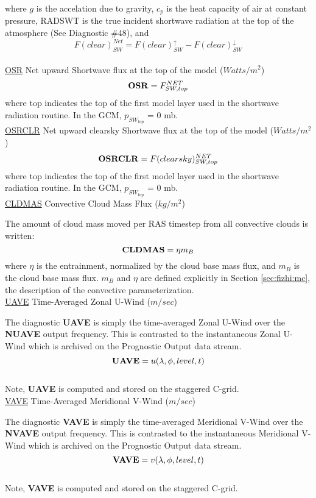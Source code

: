 \noindent
where $g$ is the accelation due to gravity,
$c_p$ is the heat capacity of air at constant pressure, RADSWT is the true incident
shortwave radiation at the top of the atmosphere (See Diagnostic \#48), and
\[
F(clear)_{SW}^{Net} = F(clear)_{SW}^\uparrow - F(clear)_{SW}^\downarrow
\]
\\

\noindent
{ \underline {OSR} Net upward Shortwave flux at the top of the model ($Watts/m^2$) }
\[
{\bf OSR}  =  F_{SW,top}^{NET}
\]                                                                                       
\noindent
where top indicates the top of the first model layer used in the shortwave radiation
routine.
In the GCM, $p_{SW_{top}}$ = 0 mb.
\\

\noindent
{ \underline {OSRCLR} Net upward clearsky Shortwave flux at the top of the model ($Watts/m^2$) }
\[
{\bf OSRCLR}  =  F(clearsky)_{SW,top}^{NET}
\]
\noindent
where top indicates the top of the first model layer used in the shortwave radiation
routine.
In the GCM, $p_{SW_{top}}$ = 0 mb.
\\


\noindent
{ \underline {CLDMAS} Convective Cloud Mass Flux ($kg/m^2$) } 

\noindent
The amount of cloud mass moved per RAS timestep from all convective clouds is written:
\[
{\bf CLDMAS} = \eta m_B
\]
where $\eta$ is the entrainment, normalized by the cloud base mass flux, and $m_B$ is
the cloud base mass flux. $m_B$ and $\eta$ are defined explicitly in Section \ref{sec:fizhi:mc}, the 
description of the convective parameterization.
\\



\noindent
{ \underline {UAVE} Time-Averaged Zonal U-Wind ($m/sec$) }

\noindent
The diagnostic {\bf UAVE} is simply the time-averaged Zonal U-Wind over
the {\bf NUAVE} output frequency.  This is contrasted to the instantaneous
Zonal U-Wind which is archived on the Prognostic Output data stream.
\[
{\bf UAVE} = u(\lambda, \phi, level , t)
\]
\\
Note, {\bf UAVE} is computed and stored on the staggered C-grid.
\\

\noindent
{ \underline {VAVE} Time-Averaged Meridional V-Wind ($m/sec$) }

\noindent
The diagnostic {\bf VAVE} is simply the time-averaged Meridional V-Wind over
the {\bf NVAVE} output frequency.  This is contrasted to the instantaneous
Meridional V-Wind which is archived on the Prognostic Output data stream.
\[
{\bf VAVE} = v(\lambda, \phi, level , t)
\]
\\
Note, {\bf VAVE} is computed and stored on the staggered C-grid.
\\

